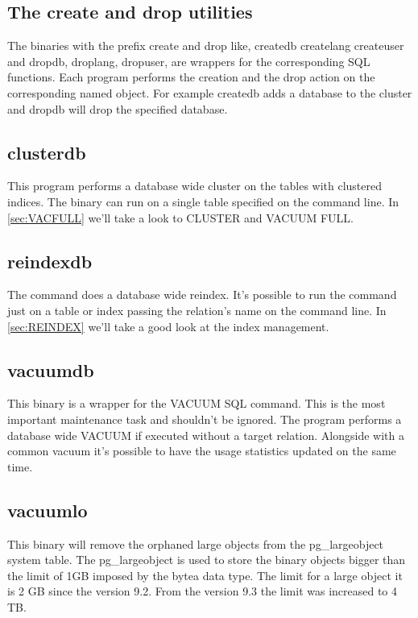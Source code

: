 \subsection{The create and drop utilities}
The binaries with the prefix create and drop like, createdb createlang createuser and dropdb, 
droplang, dropuser, are wrappers for the corresponding SQL functions. Each program performs the 
creation and the drop action on the corresponding named object. For example createdb adds a 
database to the cluster and dropdb will drop the specified database. 

\subsection{clusterdb}
This program performs a database wide cluster on the tables with clustered indices. 
The binary can run on a single table specified on the command line. In \ref{sec:VACFULL} we'll 
take a look to CLUSTER and VACUUM FULL.

\subsection{reindexdb}
The command does a database wide reindex. It's possible to run the command just on a table or index 
passing the relation's name on the command line. In \ref{sec:REINDEX} we'll take a good look at 
the index management.

\subsection{vacuumdb}
This binary is a wrapper for the VACUUM  SQL command. This is the most important 
maintenance task and shouldn't be ignored. The program performs a database wide VACUUM if executed 
without a target relation. Alongside with a common vacuum it's possible to have the usage 
statistics updated on the same time.

\subsection{vacuumlo}
This binary will remove the orphaned large objects from the pg\_largeobject system table. The 
pg\_largeobject is used to store the binary objects bigger than the limit of 1GB imposed by the 
bytea data type. The limit for a large object it is 2 GB since the version 9.2. From the version 
9.3 the limit was increased to 4 TB. 

